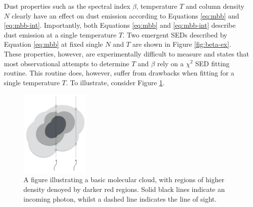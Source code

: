 \documentclass{report}
\begin{document}
Dust properties such as the spectral index $\beta$, temperature $T$ and column density $N$ clearly have an effect on dust emission according to Equations \ref{eq:mbb} and \ref{eq:mbb-int}. Importantly, both Equations \ref{eq:mbb} and \ref{eq:mbb-int} describe dust emission at a single temperature $T$. Two emergent SEDs described by Equation \ref{eq:mbb} at fixed single $N$ and $T$ are shown in Figure \ref{fig:beta-ex}. These properties, however, are experimentally difficult to measure and
\textcite{kelly} states that most observational attempts to determine $T$ and $\beta$ rely on a $\chi^{2}$ SED fitting routine. This routine does, however, suffer from drawbacks when fitting for a single temperature $T$. To illustrate, consider Figure \ref{fig:col}.

\begin{figure}[h]
  \begin{center}
    \includegraphics[width=0.3\textwidth]{../img/column.png}
    \caption[A figure illustrating a basic molecular cloud, with regions of higher density denoted by darker regions. Solid black lines indicate an incoming photon, whilst a dashed line indicates the line of sight.]{A figure illustrating a basic molecular cloud, with regions of higher density denoyed by darker red regions. Solid black lines indicate an incoming photon, whilst a dashed line indicates the line of sight.}
    \label{fig:col}
  \end{center}
\end{figure}
\end{document}
